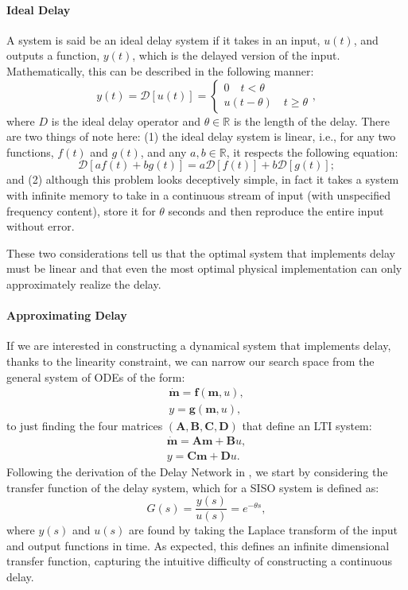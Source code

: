 \documentclass{article}
\def\vm{{\bm{m}}}
\def\mA{{\bm{A}}}
\def\mB{{\bm{B}}}
\def\mC{{\bm{C}}}
\def\mD{{\bm{D}}}
\begin{document}
\paragraph{Ideal Delay} A system is said be an ideal delay system if it takes in an input, $u(t)$, and outputs a function, $y(t)$, which is the delayed version of the input. Mathematically, this can be described in the following manner:
\begin{equation}
    y(t) = \mathcal{D}[u(t)] = \begin{cases} 0 \quad t < \theta\\ u(t-\theta) \quad t \geq \theta \end{cases},
\end{equation}
where $D$ is the ideal delay operator and $\theta \in \mathbb{R}$ is the length of the delay. There are two things of note here: (1) the ideal delay system is linear, i.e., for any two functions, $f(t)$ and $g(t)$, and any $a, b \in \mathbb{R}$, it respects the following equation:
\begin{equation}
    \mathcal{D}[af(t) + bg(t)] = a\mathcal{D}[f(t)] + b\mathcal{D}[g(t)];
\end{equation}
and (2) although this problem looks deceptively simple, in fact it takes a system with infinite memory to take in a continuous stream of input (with unspecified frequency content), store it for $\theta$ seconds and then reproduce the entire input without error.

These two considerations tell us that the optimal system that implements delay must be linear and that even the most optimal physical implementation can only approximately realize the delay.  

\paragraph{Approximating Delay} If we are interested in constructing a dynamical system that implements delay, thanks to the linearity constraint, we can narrow our search space from the general system of ODEs of the form:
\begin{align}
    \dot{\vm} = \textbf{f}(\vm, u),\\
    y = \textbf{g}(\vm, u),
\end{align}
to just finding the four matrices $(\mA, \mB, \mC, \mD)$ that define an LTI system:
\begin{align}
    \dot{\vm} = \mA \vm + \mB u,\\
    y = \mC \vm + \mD u.
\end{align}
Following the derivation of the Delay Network in \citet{voelker2018improving}, we start by considering the transfer function of the delay system, which for a SISO system is defined as:
\begin{equation}
    G(s) = \frac{y(s)}{u(s)} = e^{-\theta s},
\end{equation}
where $y(s)$ and $u(s)$ are found by taking the Laplace transform of the input and output functions in time. As expected, this defines an infinite dimensional transfer function, capturing the intuitive difficulty of constructing a continuous delay.
\end{document}
